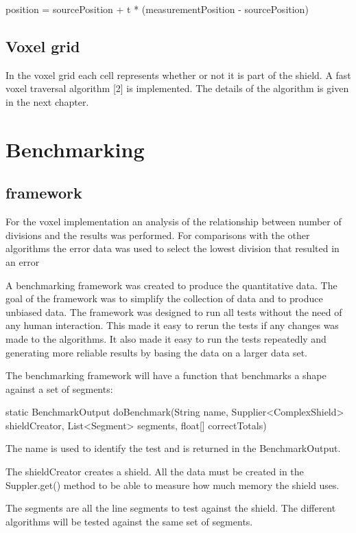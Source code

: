 \documentclass[11pt,twoside,a4paper]{report}
\begin{document}
position = sourcePosition + t * (measurementPosition - sourcePosition)

\subsection{Voxel grid}
In the voxel grid each cell represents whether or not it is part of the shield. A fast voxel traversal algorithm [2] is implemented. The details of the algorithm is given in the next chapter.


\section{Benchmarking}

\subsection{framework}
For the voxel implementation an analysis of the relationship between number of divisions and the results was performed. For comparisons with the other algorithms the error data was used to select the lowest division that resulted in an error %

A benchmarking framework was created to produce the quantitative data. The goal of the framework was to simplify the collection of data and to produce unbiased data. The framework was designed to run all tests without the need of any human interaction. This made it easy to rerun the tests if any changes was made to the algorithms. It also made it easy to run the tests repeatedly and generating more reliable results by basing the data on a larger data set.

The benchmarking framework will have a function that benchmarks a shape against a set of segments:

static BenchmarkOutput doBenchmark(String name, Supplier<ComplexShield> shieldCreator, List<Segment> segments, float[] correctTotals)

The name is used to identify the test and is returned in the BenchmarkOutput. 

The shieldCreator creates a shield. All the data must be created in the Suppler.get() method to be able to measure how much memory the shield uses.

The segments are all the line segments to test against the shield. The different algorithms will be tested against the same set of segments.
\end{document}
